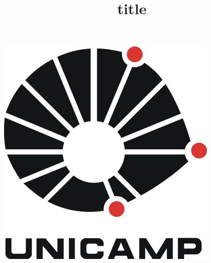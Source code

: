 \documentclass{article}
\title{title}
\begin{document}
 \maketitle
 \includegraphics{teste.jpg}
\end{document}
